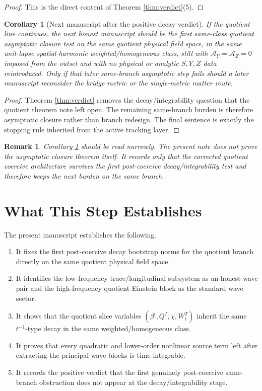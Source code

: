 \documentclass[11pt]{article}
\newcommand{\AY}{\mathcal A_Y}
\newcommand{\AZ}{\mathcal A_Z}
\newtheorem{remark}{Remark}
\newtheorem{corollary}{Corollary}
\begin{document}
\begin{proof}
This is the direct content of Theorem \ref{thm:verdict}(5).
\end{proof}

\begin{corollary}[Next manuscript after the positive decay verdict]
\label{cor:next}
If the quotient line continues, the next honest manuscript should be the first same-class quotient asymptotic closure test on the same quotient physical field space, in the same unit-lapse spatial-harmonic weighted/homogeneous class, still with \(\AY=\AZ=0\) imposed from the outset and with no physical or analytic \(S,Y,Z\) data reintroduced. Only if that later same-branch asymptotic step fails should a later manuscript reconsider the bridge metric or the single-metric matter route.
\end{corollary}

\begin{proof}
Theorem \ref{thm:verdict} removes the decay/integrability question that the quotient theorem note left open. The remaining same-branch burden is therefore asymptotic closure rather than branch redesign. The final sentence is exactly the stopping rule inherited from the active tracking layer.
\end{proof}

\begin{remark}
Corollary \ref{cor:next} should be read narrowly. The present note does \emph{not} prove the asymptotic closure theorem itself. It records only that the corrected quotient coercive architecture survives the first post-coercive decay/integrability test and therefore keeps the next burden on the same branch.
\end{remark}

\section{What This Step Establishes}

The present manuscript establishes the following.
\begin{enumerate}
    \item It fixes the first post-coercive decay bootstrap norms for the quotient branch directly on the same quotient physical field space.
    \item It identifies the low-frequency trace/longitudinal subsystem as an honest wave pair and the high-frequency quotient Einstein block as the standard wave sector.
    \item It shows that the quotient slice variables \((\beta^i,Q^I,\chi,W_i^T)\) inherit the same \(t^{-1}\)-type decay in the same weighted/homogeneous class.
    \item It proves that every quadratic and lower-order nonlinear source term left after extracting the principal wave blocks is time-integrable.
    \item It records the positive verdict that the first genuinely post-coercive same-branch obstruction does not appear at the decay/integrability stage.
\end{enumerate}
\end{document}
